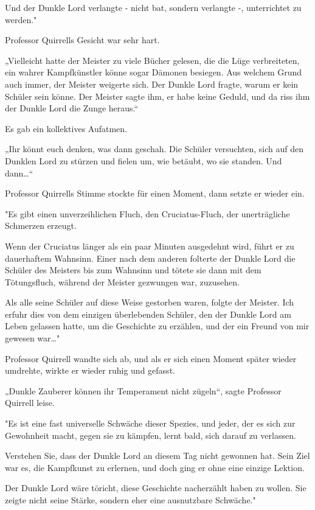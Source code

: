 {Und der Dunkle Lord verlangte - nicht bat, sondern verlangte -, unterrichtet zu werden."

Professor Quirrells Gesicht war sehr hart.

„Vielleicht hatte der Meister zu viele Bücher gelesen, die die Lüge verbreiteten, ein wahrer Kampfkünstler könne sogar Dämonen besiegen. Aus welchem Grund auch immer, der Meister weigerte sich. Der Dunkle Lord fragte, warum er kein Schüler sein könne. Der Meister sagte ihm, er habe keine Geduld, und da riss ihm der Dunkle Lord die Zunge heraus.“

Es gab ein kollektives Aufatmen.

„Ihr könnt euch denken, was dann geschah. Die Schüler versuchten, sich auf den Dunklen Lord zu stürzen und fielen um, wie betäubt, wo sie standen. Und dann…“

Professor Quirrells Stimme stockte für einen Moment, dann setzte er wieder ein.

"Es gibt einen unverzeihlichen Fluch, den Cruciatus-Fluch, der unerträgliche Schmerzen erzeugt.

Wenn der Cruciatus länger als ein paar Minuten ausgedehnt wird, führt er zu dauerhaftem Wahnsinn. Einer nach dem anderen folterte der Dunkle Lord die Schüler des Meisters bis zum Wahnsinn und tötete sie dann mit dem Tötungsfluch, während der Meister gezwungen war, zuzusehen.

Als alle seine Schüler auf diese Weise gestorben waren, folgte der Meister. Ich erfuhr dies von dem einzigen überlebenden Schüler, den der Dunkle Lord am Leben gelassen hatte, um die Geschichte zu erzählen, und der ein Freund von mir gewesen war…"

Professor Quirrell wandte sich ab, und als er sich einen Moment später wieder umdrehte, wirkte er wieder ruhig und gefasst.

„Dunkle Zauberer können ihr Temperament nicht zügeln“, sagte Professor Quirrell leise.

"Es ist eine fast universelle Schwäche dieser Spezies, und jeder, der es sich zur Gewohnheit macht, gegen sie zu kämpfen, lernt bald, sich darauf zu verlassen.

Verstehen Sie, dass der Dunkle Lord an diesem Tag nicht gewonnen hat. Sein Ziel war es, die Kampfkunst zu erlernen, und doch ging er ohne eine einzige Lektion.

Der Dunkle Lord wäre töricht, diese Geschichte nacherzählt haben zu wollen. Sie zeigte nicht seine Stärke, sondern eher eine ausnutzbare Schwäche."

}
